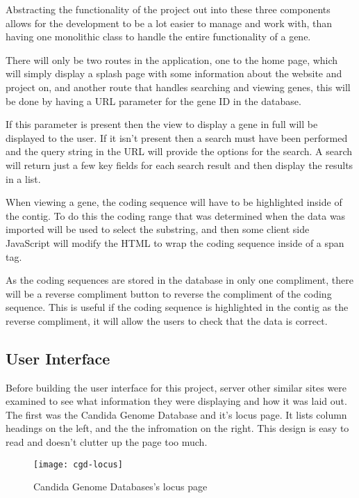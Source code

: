 Abstracting the functionality of the project out into these three components allows for the development to be a lot easier to manage and work with, than having one monolithic class to handle the entire functionality of a gene.

There will only be two routes in the application, one to the home page, which will simply display a splash page with some information about the website and project on, and another route that handles searching and viewing genes, this will be done by having a URL parameter for the gene ID in the database. 

If this parameter is present then the view to display a gene in full will be displayed to the user. If it isn't present then a search must have been performed and the query string in the URL will provide the options for the search. A search will return just a few key fields for each search result and then display the results in a list.   

When viewing a gene, the coding sequence will have to be highlighted inside of the contig. To do this the coding range that was determined when the data was imported will be used to select the substring, and then some client side JavaScript will modify the HTML to wrap the coding sequence inside of a span tag. 

As the coding sequences are stored in the database in only one compliment, there will be a reverse compliment button to reverse the compliment of the coding sequence. This is useful if the coding sequence is highlighted in the contig as the reverse compliment, it will allow the users to check that the data is correct. 

\subsection{User Interface}
Before building the user interface for this project, server other similar sites were examined to see what information they were displaying and how it was laid out. The first was the Candida Genome Database\cite{cgd} and it's locus page. It lists column headings on the left, and the the infromation on the right. This design is easy to read and doesn't clutter up the page too much.

\begin{figure}[H]
\begin{center}
\texttt{[image: cgd-locus]}
\caption{Candida Genome Databases's locus page}
\end{center}
\end{figure}

